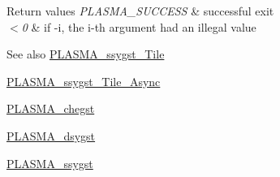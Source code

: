\begin{DoxyRetVals}{Return values}
{\em P\+L\+A\+S\+M\+A\+\_\+\+S\+U\+C\+C\+E\+S\+S} & successful exit \\
\hline
{\em $<$0} & if -\/i, the i-\/th argument had an illegal value\\
\hline
\end{DoxyRetVals}
\begin{DoxySeeAlso}{See also}
\hyperlink{group__float__Tile_ga47edc276e115a0eb253b2a4bda9a3b9e_ga47edc276e115a0eb253b2a4bda9a3b9e}{P\+L\+A\+S\+M\+A\+\_\+ssygst\+\_\+\+Tile} 

\hyperlink{group__float__Tile__Async_ga0ba80975dba7d12181f27baaae46c3eb_ga0ba80975dba7d12181f27baaae46c3eb}{P\+L\+A\+S\+M\+A\+\_\+ssygst\+\_\+\+Tile\+\_\+\+Async} 

\hyperlink{group__PLASMA__Complex32__t_gac4b81a8ac8396c84a27d8a0b719bc379_gac4b81a8ac8396c84a27d8a0b719bc379}{P\+L\+A\+S\+M\+A\+\_\+chegst} 

\hyperlink{group__double_ga7ab44c615960d36295086012efc45a7d_ga7ab44c615960d36295086012efc45a7d}{P\+L\+A\+S\+M\+A\+\_\+dsygst} 

\hyperlink{group__float_ga66b77c0de44f80760c4184756250e75e_ga66b77c0de44f80760c4184756250e75e}{P\+L\+A\+S\+M\+A\+\_\+ssygst} 
\end{DoxySeeAlso}
\hypertarget{group__float_gaa5deb8e85d037eff767d9a9e5e99fad9_gaa5deb8e85d037eff767d9a9e5e99fad9}{}
